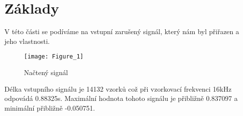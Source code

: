 \section{Základy}

V této části se podíváme na vstupní zarušený signál, který nám byl přiřazen a jeho vlastnosti.

\begin{figure}[H] 
    \centering
    \texttt{[image: Figure\_1]}
    \caption{Načtený signál}
\end{figure}

Délka vstupního signálu je 14132 vzorků což při vzorkovací frekvenci 16kHz odpovádá 0.88325s.
Maximální hodnota tohoto signálu je přibližně 0.837097 a minimální přibližně -0.050751.
